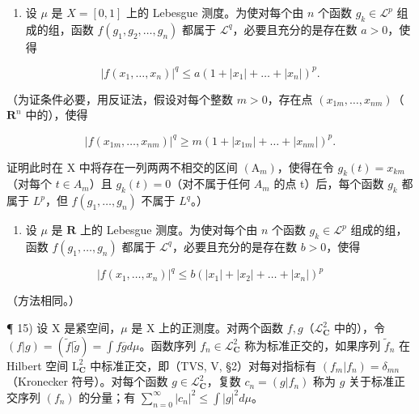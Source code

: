 \begin{enumerate}
\def\labelenumi{\alph{enumi})}
\tightlist
\item
  设 \(\mu\) 是 \(X = [0,1]\) 上的 Lebesgue 测度。为使对每个由 \(n\) 个函数 \(g_k \in \mathcal{L}^p\) 组成的组，函数 \(f(g_1, g_2, \ldots, g_n)\) 都属于 \(\mathcal{L}^q\)，必要且充分的是存在数 \(a > 0\)，使得
\end{enumerate}

\[
\left| f \left(x _ {1}, \dots , x _ {n}\right) \right| ^ {q} \leqslant a \left(1 + \left| x _ {1} \right| + \dots + \left| x _ {n} \right|\right) ^ {p}.
\]

（为证条件必要，用反证法，假设对每个整数 \(m > 0\)，存在点 \((x_{1m},\ldots ,x_{nm})\)（\(\mathbf{R}^n\) 中的），使得

\[
| f (x _ {1 m}, \dots , x _ {n m}) | ^ {q} \geqslant m (1 + | x _ {1 m} | + \dots + | x _ {n m} |) ^ {p}.
\]

证明此时在 X 中将存在一列两两不相交的区间 \((\mathrm{A}_{m})\)，使得在令 \(g_{k}(t)=x_{km}\)（对每个 \(t\in A_{m}\)）且 \(g_{k}(t)=0\)（对不属于任何 \(A_{m}\) 的点 t）后，每个函数 \(g_{k}\) 都属于 \(L^{p}\)，但 \(f(g_{1},\ldots,g_{n})\) 不属于 \(L^{q}\)。）

\begin{enumerate}
\def\labelenumi{\alph{enumi})}
\setcounter{enumi}{1}
\tightlist
\item
  设 \(\mu\) 是 \(\mathbf{R}\) 上的 Lebesgue 测度。为使对每个由 \(n\) 个函数 \(g_k \in \mathcal{L}^p\) 组成的组，函数 \(f(g_1, \ldots, g_n)\) 都属于 \(\mathcal{L}^q\)，必要且充分的是存在数 \(b > 0\)，使得
\end{enumerate}

\[
\left| f \left(x _ {1}, \dots , x _ {n}\right) \right| ^ {q} \leqslant b \left(\left| x _ {1} \right| + \left| x _ {2} \right| + \dots + \left| x _ {n} \right|\right) ^ {p}
\]

（方法相同。）

¶ 15) 设 X 是紧空间，\(\mu\) 是 X 上的正测度。对两个函数 \(f, g\)（\(\mathcal{L}_{\mathbf{C}}^{2}\) 中的），令 \((f|g) = (\widetilde{f}|\widetilde{g}) = \int f\overline{g} d\mu\)。函数序列 \(f_{n} \in \mathcal{L}_{\mathbf{C}}^{2}\) 称为标准正交的，如果序列 \(\widetilde{f}_{n}\) 在 Hilbert 空间 \(\mathrm{L}_{\mathbf{C}}^{2}\) 中标准正交，即（TVS, V, §2）对每对指标有 \((f_{m}|f_{n}) = \delta_{mn}\)（Kronecker 符号）。对每个函数 \(g \in \mathcal{L}_{\mathbf{C}}^{2}\)，复数 \(c_{n} = (g|f_{n})\) 称为 \(g\) 关于标准正交序列 \((f_{n})\) 的分量；有 \(\sum_{n=0}^{\infty} |c_{n}|^{2} \leqslant \int |g|^{2} d\mu\)。

